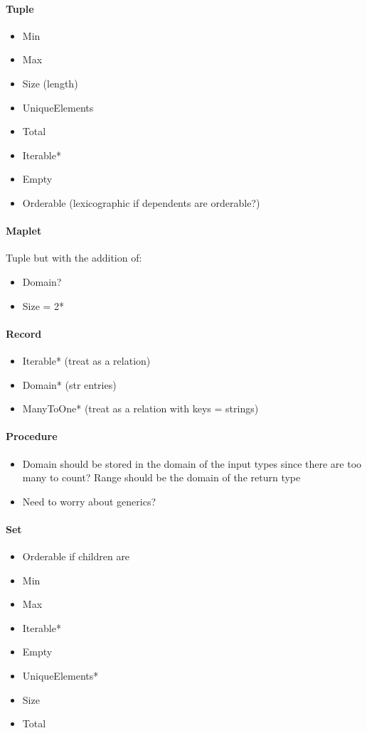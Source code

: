 \documentclass{article}
\begin{document}
\paragraph{Tuple}
\begin{itemize}
  \item Min
  \item Max
  \item Size (length)
  \item UniqueElements
  \item Total
  \item Iterable*
  \item Empty
  \item Orderable (lexicographic if dependents are orderable?)
\end{itemize}

\paragraph{Maplet} Tuple but with the addition of:
\begin{itemize}
  \item Domain?
  \item Size = 2*
\end{itemize}

\paragraph{Record}
\begin{itemize}
  \item Iterable* (treat as a relation)
  \item Domain* (str entries)
  \item ManyToOne* (treat as a relation with keys = strings)
\end{itemize}

\paragraph{Procedure}
\begin{itemize}
  \item Domain should be stored in the domain of the input types since there are too many to count? Range should be the domain of the return type
  \item Need to worry about generics?
\end{itemize}

\paragraph{Set}
\begin{itemize}
  \item Orderable if children are
  \item Min
  \item Max
  \item Iterable*
  \item Empty
  \item UniqueElements*
  \item Size
  \item Total
\end{itemize}
\end{document}
